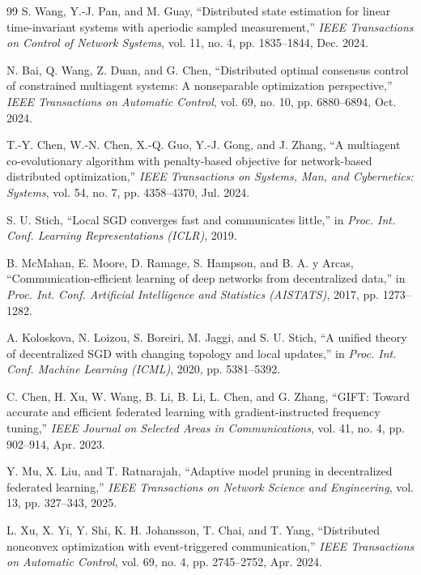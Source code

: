 \documentclass[conference]{IEEEtran}
\begin{document}
\begin{thebibliography}{99}
 S. Wang, Y.-J. Pan, and M. Guay, ``Distributed state estimation for linear time-invariant systems with aperiodic sampled measurement,'' \emph{IEEE Transactions on Control of Network Systems}, vol. 11, no. 4, pp. 1835--1844, Dec. 2024.

 N. Bai, Q. Wang, Z. Duan, and G. Chen, ``Distributed optimal consensus control of constrained multiagent systems: A nonseparable optimization perspective,'' \emph{IEEE Transactions on Automatic Control}, vol. 69, no. 10, pp. 6880--6894, Oct. 2024.

 T.-Y. Chen, W.-N. Chen, X.-Q. Guo, Y.-J. Gong, and J. Zhang, ``A multiagent co-evolutionary algorithm with penalty-based objective for network-based distributed optimization,'' \emph{IEEE Transactions on Systems, Man, and Cybernetics: Systems}, vol. 54, no. 7, pp. 4358--4370, Jul. 2024.

 S. U. Stich, ``Local SGD converges fast and communicates little,'' in \emph{Proc. Int. Conf. Learning Representations (ICLR)}, 2019.

 B. McMahan, E. Moore, D. Ramage, S. Hampson, and B. A. y Arcas, ``Communication-efficient learning of deep networks from decentralized data,'' in \emph{Proc. Int. Conf. Artificial Intelligence and Statistics (AISTATS)}, 2017, pp. 1273--1282.

 A. Koloskova, N. Loizou, S. Boreiri, M. Jaggi, and S. U. Stich, ``A unified theory of decentralized SGD with changing topology and local updates,'' in \emph{Proc. Int. Conf. Machine Learning (ICML)}, 2020, pp. 5381--5392.

 C. Chen, H. Xu, W. Wang, B. Li, B. Li, L. Chen, and G. Zhang, ``GIFT: Toward accurate and efficient federated learning with gradient-instructed frequency tuning,'' \emph{IEEE Journal on Selected Areas in Communications}, vol. 41, no. 4, pp. 902--914, Apr. 2023.

 Y. Mu, X. Liu, and T. Ratnarajah, ``Adaptive model pruning in decentralized federated learning,'' \emph{IEEE Transactions on Network Science and Engineering}, vol. 13, pp. 327--343, 2025.

 L. Xu, X. Yi, Y. Shi, K. H. Johansson, T. Chai, and T. Yang, ``Distributed nonconvex optimization with event-triggered communication,'' \emph{IEEE Transactions on Automatic Control}, vol. 69, no. 4, pp. 2745--2752, Apr. 2024.


\end{thebibliography}
\end{document}
